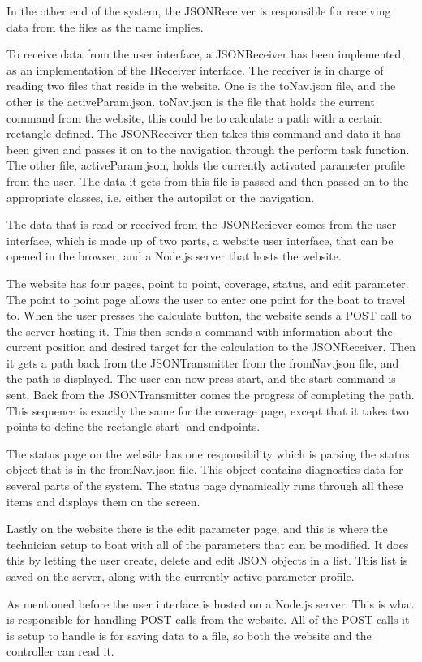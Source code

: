 In the other end of the system, the JSONReceiver is responsible for receiving data from the files as the name implies.

To receive data from the user interface, a JSONReceiver has been implemented, as an implementation of the IReceiver interface. The receiver is in charge of reading two files that reside in the website. One is the toNav.json file, and the other is the activeParam.json. toNav.json is the file that holds the current command from the website, this could be to calculate a path with a certain rectangle defined. The JSONReceiver then takes this command and data it has been given and passes it on to the navigation through the perform task function. The other file, activeParam.json, holds the currently activated parameter profile from the user. The data it gets from this file is passed and then passed on to the appropriate classes, i.e. either the autopilot or the navigation.

The data that is read or received from the JSONReciever comes from the user interface, which is made up of two parts, a website user interface, that can be opened in the browser, and a Node.js server that hosts the website. 

The website has four pages, point to point, coverage, status, and edit parameter. The point to point page allows the user to enter one point for the boat to travel to. When the user presses the calculate button, the website sends a POST call to the server hosting it. This then sends a command with information about the current position and desired target for the calculation to the JSONReceiver. Then it gets a path back from the JSONTransmitter from the fromNav.json file, and the path is displayed. The user can now press start, and the start command is sent. Back from the JSONTransmitter comes the progress of completing the path. This sequence is exactly the same for the coverage page, except that it takes two points to define the rectangle start- and endpoints. 

The status page on the website has one responsibility which is parsing the status object that is in the fromNav.json file. This object contains diagnostics data for several parts of the system. The status page dynamically runs through all these items and displays them on the screen.

Lastly on the website there is the edit parameter page, and this is where the technician setup to boat with all of the parameters that can be modified. It does this by letting the user create, delete and edit JSON objects in a list. This list is saved on the server, along with the currently active parameter profile. 

As mentioned before the user interface is hosted on a Node.js server\cite{nodejs}. This is what is responsible for handling POST calls from the website. All of the POST calls it is setup to handle is for saving data to a file, so both the website and the controller can read it.



